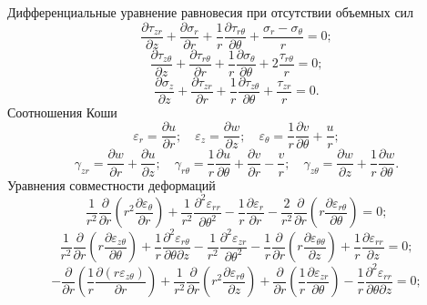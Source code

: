 \documentclass[press]{vestnik}
\begin{document}
Дифференциальные уравнение равновесия при отсутствии объемных сил~\cite{B12}
\[
\frac{\partial \tau_{zr} }{\partial z}+\frac{\partial \sigma_{r} 
}{\partial r}+\frac{1}{r}\frac{\partial \tau_{r\theta } }{\partial \theta 
}+\frac{\sigma_{r} -\sigma_{\theta } }{r}=0;
\]
\begin{equation}
\label{eq1}
\frac{\partial \tau_{z\theta } }{\partial z}+\frac{\partial \tau_{r\theta 
} }{\partial r}+\frac{1}{r}\frac{\partial \sigma_{\theta } }{\partial 
\theta }+2\frac{\tau_{r\theta } }{r}=0;
\end{equation}
\[
\frac{\partial \sigma_{z} }{\partial z}+\frac{\partial \tau_{zr} 
}{\partial r}+\frac{1}{r}\frac{\partial \tau_{z\theta } }{\partial \theta 
}+\frac{\tau_{zr} }{r}=0.
\]
Соотношения Коши~\cite{B12}
\begin{equation}
\label{eq2}
\varepsilon_{r} =\frac{\partial u}{\partial r};
\quad
\varepsilon_{z} =\frac{\partial w}{\partial z};
\quad
\varepsilon_{\theta } =\frac{1}{r}\frac{\partial v}{\partial \theta 
}+\frac{u}{r};
\end{equation}
\[
\gamma_{zr} =\frac{\partial w}{\partial r}+\frac{\partial u}{\partial z};
\quad
\gamma_{r\theta } =\frac{1}{r}\frac{\partial u}{\partial \theta 
}+\frac{\partial v}{\partial r}-\frac{v}{r};
\quad
\gamma_{z\theta } =\frac{\partial w}{\partial z}+\frac{1}{r}\frac{\partial 
w}{\partial \theta }.
\]
Уравнения совместности деформаций~\cite{B13}
\[
\frac{1}{r^{2}}\frac{\partial }{\partial r}\left(r^{2}\frac{\partial \varepsilon 
_{\theta } }{\partial r}\right)+\frac{1}{r^{2}}\frac{\partial^{2}\varepsilon 
_{rr} }{\partial \theta^{2}}-\frac{1}{r}\frac{\partial \varepsilon_{r} 
}{\partial r}-\frac{2}{r^{2}}\frac{\partial }{\partial r}\left(r\frac{\partial 
\varepsilon_{r\theta } }{\partial \theta }\right)=0;
\]
\[
\frac{1}{r^{2}}\frac{\partial }{\partial r}\left(r\frac{\partial \varepsilon 
_{z\theta } }{\partial \theta }\right)+\frac{1}{r}\frac{\partial^{2}\varepsilon 
_{r\theta } }{\partial \theta \partial z}-\frac{1}{r^{2}}\frac{\partial 
^{2}\varepsilon_{zr} }{\partial \theta^{2}}-\frac{1}{r}\frac{\partial 
}{\partial r}\left(r\frac{\partial \varepsilon_{\theta \theta } }{\partial 
z}\right)+\frac{1}{r}\frac{\partial \varepsilon_{rr} }{\partial z}=0;
\]
\begin{equation}
\label{eq3}
-\frac{\partial }{\partial r}\left(\frac{1}{r}\frac{\partial (r\varepsilon 
_{z\theta } )}{\partial r}\right)+\frac{1}{r^{2}}\frac{\partial }{\partial 
r}(r^{2}\frac{\partial \varepsilon_{r\theta } }{\partial z})+\frac{\partial 
}{\partial r}\left(\frac{1}{r}\frac{\partial \varepsilon_{zr} }{\partial \theta 
}\right)-\frac{1}{r}\frac{\partial^{2}\varepsilon_{rr} }{\partial \theta \partial z}=0;
\end{equation}
\end{document}
